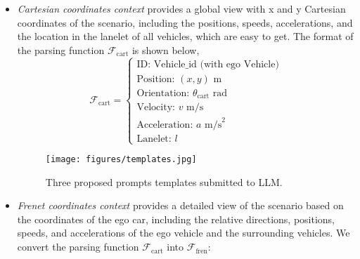 \begin{itemize}
    \item \textit{Cartesian coordinates context} provides a global view with x and y Cartesian coordinates of the scenario, including the positions, speeds, accelerations, and the location in the lanelet of all vehicles, which are easy to get. 
    The format of the parsing function $ \mathcal{F}_{\text{cart}}$ is shown below,
    {\small
    \[
    \mathcal{F}_{\text{cart}} =
    \begin{cases}
    \text{ID: } \text{Vehicle\_id (with ego Vehicle)} \\
    \text{Position: } (x, y)  \text{ m} \\
    \text{Orientation: } \theta_{\text{cart}} \text{ rad } \\
    \text{Velocity: } v \text{ m/s} \\
    \text{Acceleration: } a \text{ m/s}^2 \\
    \text{Lanelet: } l
    \end{cases}
    \]}
\begin{figure*}[ht]
    \centering
    \texttt{[image: figures/templates.jpg]} 
    \caption{Three proposed prompts templates submitted to LLM.}
    \label{fig:prompt} %
\end{figure*}
    \item \textit{Frenet\cite{werling2012optimal} coordinates context} provides a detailed view of the scenario based on the coordinates of the ego car, including the relative directions, positions, speeds, and accelerations of the ego vehicle and the surrounding vehicles. We convert the parsing function \( \mathcal{F}_{\text{cart}} \) into \( \mathcal{F}_{\text{fren}} \):


\end{itemize}
